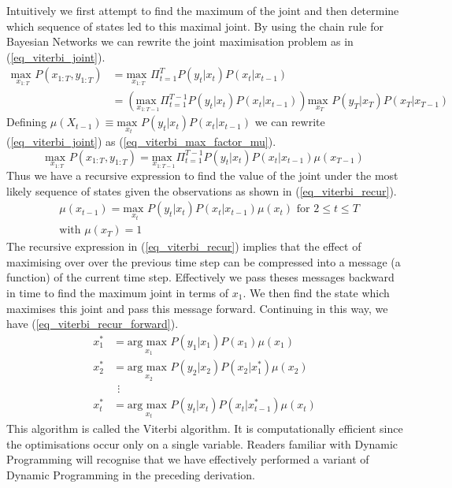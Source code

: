 \documentclass[../masters.tex]{subfiles}
\begin{document}
Intuitively we first attempt to find the maximum of the joint and then determine which sequence of states led to this maximal joint. By using the chain rule for Bayesian Networks we can rewrite the joint maximisation problem as in (\ref{eq_viterbi_joint}).
\begin{equation}
\begin{aligned}
\underset{x_{1:T}}{\text{max }} P(x_{1:T}, y_{1:T}) &= \underset{x_{1:T}}{\text{max }} \Pi_{t=1}^T P(y_t|x_t) P(x_t|x_{t-1})\\
&= \left(\underset{x_{1:T-1}}{\text{max }} \Pi_{t=1}^{T-1} P(y_t|x_t) P(x_t|x_{t-1}) \right) \underset{x_{T}}{\text{max }} P(y_T|x_T) P(x_T|x_{T-1})
\end{aligned}
\label{eq_viterbi_joint}
\end{equation}
Defining $\mu(X_{t-1}) \equiv \underset{x_{t}}{\text{max }} P(y_t|x_t) P(x_t|x_{t-1})$ we can rewrite (\ref{eq_viterbi_joint}) as (\ref{eq_viterbi_max_factor_mu}).
\begin{equation}
\underset{x_{1:T}}{\text{max }} P(x_{1:T}, y_{1:T}) =\underset{x_{1:T-1}}{\text{max }} \Pi_{t=1}^{T-1} P(y_t|x_t) P(x_t|x_{t-1}) \mu(x_{T-1})
\label{eq_viterbi_max_factor_mu}
\end{equation}
Thus we have a recursive expression to find the value of the joint under the most likely sequence of states given the observations as shown in (\ref{eq_viterbi_recur}).
\begin{equation}
\begin{aligned}
&\mu(x_{t-1}) = \underset{x_{t}}{\text{max }} P(y_t|x_t) P(x_t|x_{t-1}) \mu(x_t) \text{ for } 2 \leq t \leq T \\
&\text{with } \mu(x_T) = 1 
\end{aligned}
\label{eq_viterbi_recur}
\end{equation}
The recursive expression in (\ref{eq_viterbi_recur}) implies that the effect of maximising over over the previous time step can be compressed into a message (a function) of the current time step. Effectively we pass theses messages backward in time to find the maximum joint in terms of $x_1$. We then find the state which maximises this joint and pass this message forward.  Continuing in this way, we have (\ref{eq_viterbi_recur_forward}).
\begin{equation}
\begin{aligned}
x_1^* &= \underset{x_{1}}{\text{arg max }}P(y_1|x_1)P(x_1)\mu(x_1) \\
x_2^* &= \underset{x_{2}}{\text{arg max }}P(y_2|x_2)P(x_2|x_1^*)\mu(x_2) \\
&~~\vdots \\
x_t^* &= \underset{x_{t}}{\text{arg max }}P(y_t|x_t)P(x_t|x_{t-1}^*)\mu(x_t)
\end{aligned}
\label{eq_viterbi_recur_forward}
\end{equation}
This algorithm is called the Viterbi algorithm. It is computationally efficient since the optimisations occur only on a single variable. Readers familiar with Dynamic Programming will recognise that we have effectively performed a variant of Dynamic Programming in the preceding derivation.
\end{document}
